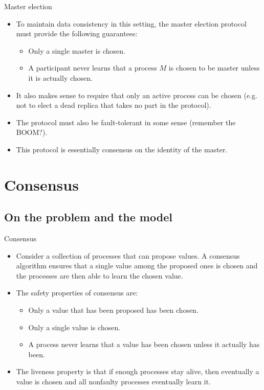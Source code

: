 \documentclass{beamer}
\begin{document}
\begin{frame}{Master election}
  \begin{itemize}
    \item  To maintain data consistency in this setting, the master election protocol \alert{must} provide the following guarantees:
      \begin{itemize}
        \item Only a single master is chosen.
        \item A participant never learns that a process $M$ is chosen to be master unless it is actually chosen.
      \end{itemize}
    \item It also makes sense to require that only an active process can be chosen (e.g. not to elect a dead replica that takes no part in the protocol).
    \item The protocol must also be fault-tolerant in some sense (remember the BOOM?).
    \item This protocol is essentially \alert{consensus} on the identity of the master.
  \end{itemize}
\end{frame}

\section{Consensus}
\subsection{On the problem and the model}
\begin{frame}{Consensus}
  \begin{itemize}
    \item Consider a collection of processes that can propose values. A \alert{consensus} algorithm ensures that a single value among the proposed ones is chosen and the processes are then able to learn the chosen value.
    \item The \alert{safety} properties of consensus are:
      \begin{itemize}
        \item Only a value that has been proposed has been chosen.
        \item Only a single value is chosen.
        \item A process never learns that a value has been chosen unless it actually has been.
      \end{itemize}
    \item The liveness property is that if enough processes stay alive, then eventually a value is chosen and all nonfaulty processes eventually learn it.
  \end{itemize}
\end{frame}
\end{document}
